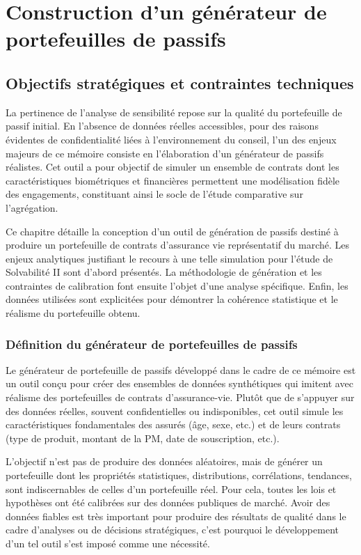 \chapter{Construction d'un générateur de portefeuilles de passifs}
\label{chap:generation_passifs}
\section{Objectifs stratégiques et contraintes techniques}
La pertinence de l'analyse de sensibilité repose sur la qualité du portefeuille de passif initial. En l'absence de données réelles accessibles, pour des raisons évidentes de confidentialité liées à l'environnement du conseil, l'un des enjeux majeurs de ce mémoire consiste en l'élaboration d'un générateur de passifs réalistes. Cet outil a pour objectif de simuler un ensemble de contrats dont les caractéristiques biométriques et financières permettent une modélisation fidèle des engagements, constituant ainsi le socle de l’étude comparative sur l'agrégation.

Ce chapitre détaille la conception d'un outil de génération de passifs destiné à produire un portefeuille de contrats d'assurance vie représentatif du marché. Les enjeux analytiques justifiant le recours à une telle simulation pour l'étude de Solvabilité II sont d'abord présentés. La méthodologie de génération et les contraintes de calibration font ensuite l'objet d'une analyse spécifique. Enfin, les données utilisées sont explicitées pour démontrer la cohérence statistique et le réalisme du portefeuille obtenu.

\subsection{Définition du générateur de portefeuilles de passifs}
Le générateur de portefeuille de passifs développé dans le cadre de ce mémoire est un outil conçu pour créer des ensembles de données synthétiques qui imitent avec réalisme des portefeuilles de contrats d'assurance-vie. Plutôt que de s'appuyer sur des données réelles, souvent confidentielles ou indisponibles, cet outil simule les caractéristiques fondamentales des assurés (âge, sexe, etc.) et de leurs contrats (type de produit, montant de la PM, date de souscription, etc.).

L'objectif n'est pas de produire des données aléatoires, mais de générer un portefeuille dont les propriétés statistiques, distributions, corrélations, tendances, sont indiscernables de celles d'un portefeuille réel. Pour cela, toutes les lois et hypothèses ont été calibrées sur des données publiques de marché. Avoir des données fiables est très important pour produire des résultats de qualité dans le cadre d'analyses ou de décisions stratégiques, c'est pourquoi le développement d'un tel outil s'est imposé comme une nécessité.


